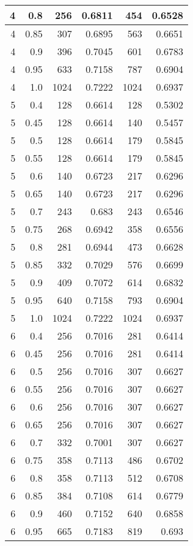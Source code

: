 \begin{center}
\begin{longtable}{|r|r|r|r|r|r|}
4 & 0.8 & 256 & 0.6811 & 454 & 0.6528 \\
\hline
4 & 0.85 & 307 & 0.6895 & 563 & 0.6651 \\
\hline
4 & 0.9 & 396 & 0.7045 & 601 & 0.6783 \\
\hline
4 & 0.95 & 633 & 0.7158 & 787 & 0.6904 \\
\hline
4 & 1.0 & 1024 & 0.7222 & 1024 & 0.6937 \\
\hline
5 & 0.4 & 128 & 0.6614 & 128 & 0.5302 \\
\hline
5 & 0.45 & 128 & 0.6614 & 140 & 0.5457 \\
\hline
5 & 0.5 & 128 & 0.6614 & 179 & 0.5845 \\
\hline
5 & 0.55 & 128 & 0.6614 & 179 & 0.5845 \\
\hline
5 & 0.6 & 140 & 0.6723 & 217 & 0.6296 \\
\hline
5 & 0.65 & 140 & 0.6723 & 217 & 0.6296 \\
\hline
5 & 0.7 & 243 & 0.683 & 243 & 0.6546 \\
\hline
5 & 0.75 & 268 & 0.6942 & 358 & 0.6556 \\
\hline
5 & 0.8 & 281 & 0.6944 & 473 & 0.6628 \\
\hline
5 & 0.85 & 332 & 0.7029 & 576 & 0.6699 \\
\hline
5 & 0.9 & 409 & 0.7072 & 614 & 0.6832 \\
\hline
5 & 0.95 & 640 & 0.7158 & 793 & 0.6904 \\
\hline
5 & 1.0 & 1024 & 0.7222 & 1024 & 0.6937 \\
\hline
6 & 0.4 & 256 & 0.7016 & 281 & 0.6414 \\
\hline
6 & 0.45 & 256 & 0.7016 & 281 & 0.6414 \\
\hline
6 & 0.5 & 256 & 0.7016 & 307 & 0.6627 \\
\hline
6 & 0.55 & 256 & 0.7016 & 307 & 0.6627 \\
\hline
6 & 0.6 & 256 & 0.7016 & 307 & 0.6627 \\
\hline
6 & 0.65 & 256 & 0.7016 & 307 & 0.6627 \\
\hline
6 & 0.7 & 332 & 0.7001 & 307 & 0.6627 \\
\hline
6 & 0.75 & 358 & 0.7113 & 486 & 0.6702 \\
\hline
6 & 0.8 & 358 & 0.7113 & 512 & 0.6708 \\
\hline
6 & 0.85 & 384 & 0.7108 & 614 & 0.6779 \\
\hline
6 & 0.9 & 460 & 0.7152 & 640 & 0.6858 \\
\hline
6 & 0.95 & 665 & 0.7183 & 819 & 0.693 \\

\end{longtable}
\end{center}
